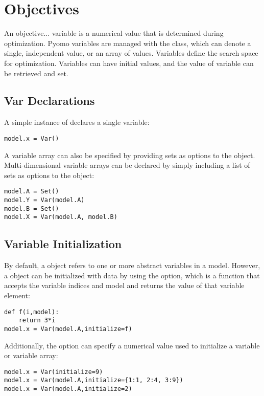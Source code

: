 \section{Objectives}

An objective... variable is a numerical value that is determined during optimization.
Pyomo variables are managed with the  class, which can denote
a single, independent value, or an array of values.  Variables define
the search space for optimization.  Variables can have initial values,
and the value of variable can be retrieved and set.


\subsection{Var Declarations}

A simple instance of  declares a single variable:
\begin{lstlisting}
model.x = Var()
\end{lstlisting}
A variable array can also be specified by providing sets as options
to the  object.  Multi-dimensional variable arrays can be declared by simply including a list of sets as options to the  object:
\begin{lstlisting}
model.A = Set()
model.Y = Var(model.A)
model.B = Set()
model.X = Var(model.A, model.B)
\end{lstlisting}


\subsection{Variable Initialization}

By default, a  object refers to one or more abstract variables in a model.  However,
a  object can be initialized with data by using the  option, which is a function 
that accepts the variable indices and model and returns the value of that variable element:
\begin{lstlisting}
def f(i,model):
    return 3*i
model.x = Var(model.A,initialize=f)
\end{lstlisting}
Additionally, the  option can specify a numerical value used to 
initialize a variable or variable array:
\begin{lstlisting}
model.x = Var(initialize=9)
model.x = Var(model.A,initialize={1:1, 2:4, 3:9})
model.x = Var(model.A,initialize=2)
\end{lstlisting}


